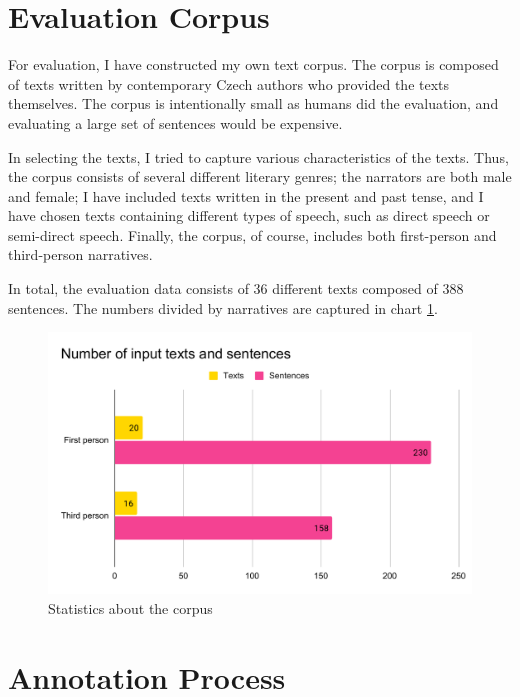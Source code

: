 
\section{Evaluation Corpus}

For evaluation, I have constructed my own text corpus. The corpus is composed of texts written by contemporary Czech authors who provided the texts themselves. The corpus is intentionally small as humans did the evaluation, and evaluating a large set of sentences would be expensive.

In selecting the texts, I tried to capture various characteristics of the texts. Thus, the corpus consists of several different literary genres; the narrators are both male and female; I have included texts written in the present and past tense, and I have chosen texts containing different types of speech, such as direct speech or semi-direct speech. Finally, the corpus, of course, includes both first-person and third-person narratives.

In total, the evaluation data consists of 36 different texts composed of 388 sentences. The numbers divided by narratives are captured in chart \ref{fig:eval-input-numbers}.

\begin{figure}[!ht]
\includegraphics[width=\textwidth]{data/Eval-Input-Numbers.pdf}
\caption{Statistics about the corpus}
\label{fig:eval-input-numbers}
\end{figure}

\section{Annotation Process}

